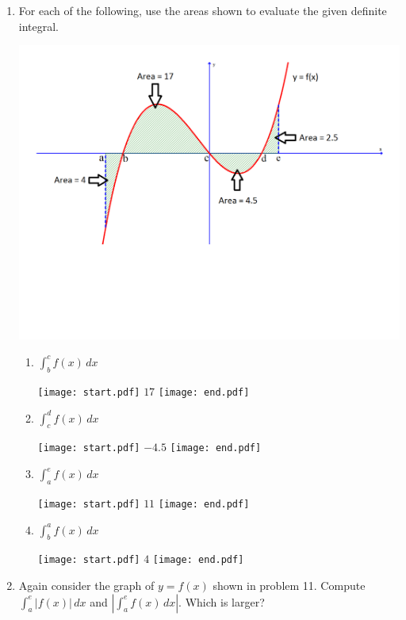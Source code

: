 \documentclass[12pt]{article}
\begin{document}
\begin{enumerate}
\item For each of the following, use the areas shown to evaluate the given definite integral.

\begin{center}

\includegraphics[scale=0.4]{area_graph.pdf}

\end{center}

\begin{enumerate}

\item $\int_b^c{f(x)} \,dx$

\texttt{[image: start.pdf]}
{{$17$}}
\texttt{[image: end.pdf]}


\item $\int_c^d{f(x)} \,dx$

\texttt{[image: start.pdf]}
{{$-4.5$}}
\texttt{[image: end.pdf]}


\item $\int_a^e{f(x)} \,dx$

\texttt{[image: start.pdf]}
{{$11$}}
\texttt{[image: end.pdf]}


\item $\int_b^a{f(x)} \,dx$

\texttt{[image: start.pdf]}
{{$4$}}
\texttt{[image: end.pdf]}


\end{enumerate}

\item Again consider the graph of $y=f(x)$ shown in problem 11.  Compute $\int_a^e{|f(x)|} \,dx$ and $\left|\int_a^e{f(x)} \,dx \right|$.  Which is larger?


\end{enumerate}
\end{document}
